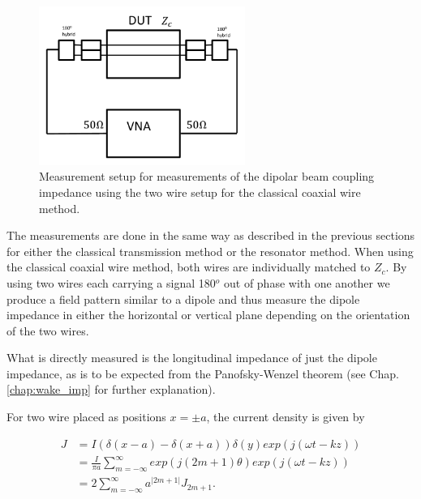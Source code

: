 \documentclass[review, number, sort&compress]{elsarticle}
\begin{document}
\begin{figure}
\begin{center}
\includegraphics[width=0.6\textwidth]{figures/wire_meas_two_wire.pdf}
\end{center}
\label{fig:two_wire_measure}
\caption{Measurement setup for measurements of the dipolar beam coupling impedance using the two wire setup for the classical coaxial wire method.}
\end{figure}

The measurements are done in the same way as described in the previous sections for either the classical transmission method or the resonator method. When using the classical coaxial wire method, both wires are individually matched to $Z_{c}$. By using two wires each carrying a signal 180$^{o}$ out of phase with one another we produce a field pattern similar to a dipole and thus measure the dipole impedance in either the horizontal or vertical plane depending on the orientation of the two wires. 

What is directly measured is the longitudinal impedance of just the dipole impedance, as is to be expected from the Panofsky-Wenzel theorem (see Chap. \ref{chap:wake_imp} for further explanation). 

For two wire placed as positions $x = \pm a$, the current density is given by \cite{Tsutsui:OnSingleWire}

\begin{align}
J & =  I \left( \delta \left( x - a \right) - \delta \left( x + a  \right) \right) \delta (y) exp \left( j \left( \omega t - kz \right) \right) \nonumber \\
& =  \frac{I}{\pi a} \displaystyle\sum\limits_{m=-\infty}^{\infty} exp \left(j \left( 2m +1 \right) \theta \right) exp \left( j \left( \omega t - kz \right) \right) \nonumber \\
& =  2\displaystyle\sum\limits_{m=-\infty}^{\infty} a^{|2m + 1 |} J_{2m + 1}.
\end{align}
\end{document}
